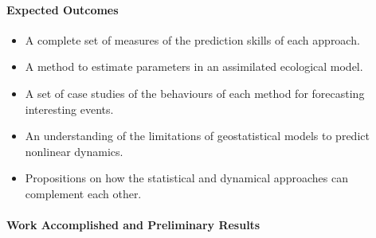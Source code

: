 \paragraph{Expected Outcomes}

\begin{itemize}
\item A complete set of measures of the prediction skills of each approach.
\item A method to estimate parameters in an assimilated ecological model.
\item A set of case studies of the behaviours of each method for forecasting interesting events.
\item An understanding of the limitations of geostatistical models to predict nonlinear dynamics. 
\item Propositions on how the statistical and dynamical approaches can complement each other.
\end{itemize}

\paragraph{Work Accomplished and Preliminary Results}

